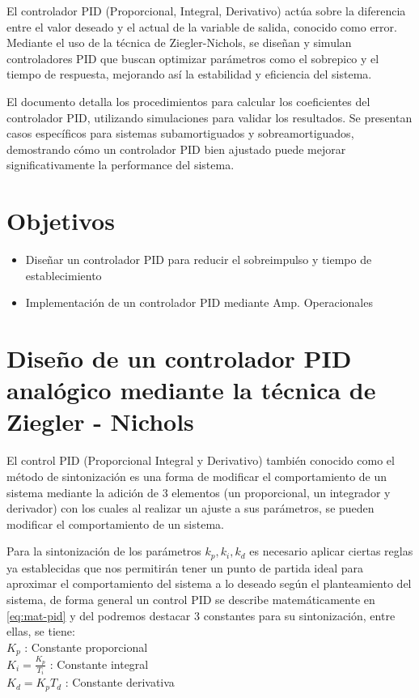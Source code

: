 \documentclass[conference]{IEEEtran}
\begin{document}
	El controlador PID (Proporcional, Integral, Derivativo) actúa sobre la diferencia entre el valor deseado y el actual de la variable de salida, conocido como error. Mediante el uso de la técnica de Ziegler-Nichols, se diseñan y simulan controladores PID que buscan optimizar parámetros como el sobrepico y el tiempo de respuesta, mejorando así la estabilidad y eficiencia del sistema.
	
	El documento detalla los procedimientos para calcular los coeficientes del controlador PID, utilizando simulaciones para validar los resultados. Se presentan casos específicos para sistemas subamortiguados y sobreamortiguados, demostrando cómo un controlador PID bien ajustado puede mejorar significativamente la performance del sistema.
	
	\section{Objetivos}
	
	\begin{itemize}
		\item Diseñar un controlador PID para reducir el sobreimpulso y tiempo de establecimiento
		\item Implementación de un controlador PID mediante Amp. Operacionales
	\end{itemize}
	
	\section{Diseño de un controlador PID analógico mediante la técnica de Ziegler - Nichols}
	El control PID (Proporcional Integral y Derivativo) también conocido como el método de sintonización es una forma de modificar el comportamiento de un sistema mediante la adición de 3 elementos (un proporcional, un integrador y  derivador) con los cuales al realizar un ajuste a sus parámetros, se pueden modificar el comportamiento de un sistema.
	
	Para la sintonización de los parámetros $k_p, k_i, k_d$ es necesario aplicar ciertas reglas ya establecidas que nos permitirán tener un punto de partida ideal para aproximar el comportamiento del sistema a lo deseado según el planteamiento del sistema, de forma general un control PID se describe matemáticamente en \ref{eq:mat-pid} y del podremos destacar 3 constantes para su sintonización, entre ellas, se tiene: \\
	
	$K_p$ : Constante proporcional \\
	$K_i = \frac{K_p}{T_i}$ : Constante integral \\
	$K_d = K_pT_d$ : Constante derivativa \\
	
\end{document}
